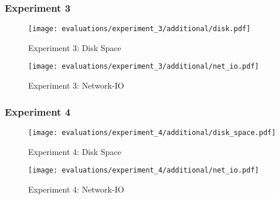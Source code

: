 \pagebreak
\subsubsection{Experiment 3}

\begin{figure}[h]
    \begin{adjustwidth}{-0.2\paperwidth}{-0.2\paperwidth}
        \centering
        \texttt{[image: evaluations/experiment\_3/additional/disk.pdf]}
        \caption{Experiment 3: Disk Space}
        \label{fig:eval_3_disk}
    \end{adjustwidth}
\end{figure}

\begin{figure}[h]
    \begin{adjustwidth}{-0.2\paperwidth}{-0.2\paperwidth}
        \centering
        \texttt{[image: evaluations/experiment\_3/additional/net\_io.pdf]}
        \caption{Experiment 3: Network-IO}
        \label{fig:eval_3_net_io}
    \end{adjustwidth}
\end{figure}

\pagebreak
\subsubsection{Experiment 4}

\begin{figure}[H]
    \begin{adjustwidth}{-0.2\paperwidth}{-0.2\paperwidth}
        \centering
        \texttt{[image: evaluations/experiment\_4/additional/disk\_space.pdf]}
        \caption{Experiment 4: Disk Space}
        \label{fig:eval_4_disk}
    \end{adjustwidth}
\end{figure}

\begin{figure}[H]
    \begin{adjustwidth}{-0.2\paperwidth}{-0.2\paperwidth}
        \centering
        \texttt{[image: evaluations/experiment\_4/additional/net\_io.pdf]}
        \caption{Experiment 4: Network-IO}
        \label{fig:eval_4_net_io}
    \end{adjustwidth}
\end{figure}

